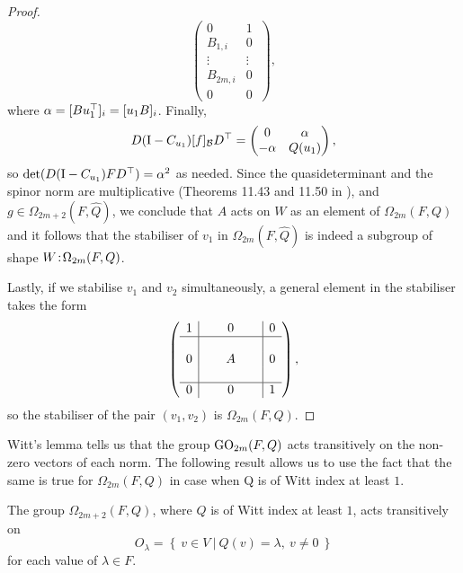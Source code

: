 \begin{proof}
\begin{equation*}
\begin{pmatrix}
	    0 & 1\  \\
	    B_{1,i} & 0\  \\
	    \vdots & \vdots \\
	    B_{2m,i} & 0\  \\
	    0 & 0
	\end{pmatrix},
    \end{equation*}
    where $\alpha = [Bu_1^\top]_i = [u_1B]_i$. Finally, 
    \begin{equation*}
	D(\mathord{\mathrm{I}}-C_{u_1}) [f]_{\mathcal{B}} D^\top = \begin{pmatrix}
	    0 & \alpha \\
	    -\alpha & Q(u_1)
	\end{pmatrix},
    \end{equation*}
    so $\det(D(\mathord{\mathrm{I}}-C_{u_1})FD^\top) = \alpha^2$ as needed. Since the quasideterminant and 
    the spinor norm are multiplicative (Theorems 11.43 and 11.50 in \cite{Taylor}),
    and $g \in \Omega_{2m+2}(F,\hat{Q})$, we conclude that $A$ acts on $W$ as
    an element of $\Omega_{2m}(F,Q)$ and it follows that the stabiliser
    of $v_1$ in $\Omega_{2m}(F,\hat{Q})$ is indeed a subgroup of shape
    $W\mathord{{\;\!{:}\;\!}}\Omega_{2m}(F,Q)$.
    
    Lastly, if we stabilise $v_1$ and $v_2$ simultaneously, a general element in the
    stabiliser takes the form
    \begin{equation*}
	\left(
	    \begin{array}{c|c|c}
		1 & 0 & 0 \\ \hline 
		 & & \\
		0 &\ \ \ \ \ A\ \ \ \ \  & 0 \\ 
		 & & \\ \hline 
		0 & 0 & 1
	    \end{array}
	\right),
    \end{equation*}
    so the stabiliser of the pair $(v_1,v_2)$ is $\Omega_{2m}(F,Q)$. 
\end{proof}

Witt's lemma tells us that the group $\mathrm{GO}_{2m}(F,Q)$ acts transitively 
on the non-zero vectors of each norm. The following result allows us to use the fact
that the same is true for $\Omega_{2m}(F,Q)$ in case when Q is of Witt index at least $1$.

\begin{lemma}
    \label{lemma:A_omega_transitive}
    The group $\Omega_{2m+2}(F,Q)$, where $Q$ is of Witt index at least $1$, 
    acts transitively on
    \begin{equation*}
	O_{\lambda} = \left\{ \  v \in V\ \big|\ Q(v) = \lambda,\ v \neq 0 \ \right\}
    \end{equation*}
    for each value of $\lambda \in F$.
\end{lemma}

